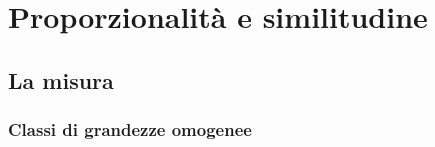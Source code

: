 
\chapter{Proporzionalità e similitudine}



\section{La misura}\label{sect:misura2}

\subsection{Classi di grandezze omogenee}

